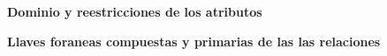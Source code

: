 \textbf{Dominio y reestricciones de los atributos} \vspace{.3cm}

\textbf{Llaves foraneas compuestas y primarias de las las relaciones} \vspace{.3cm}